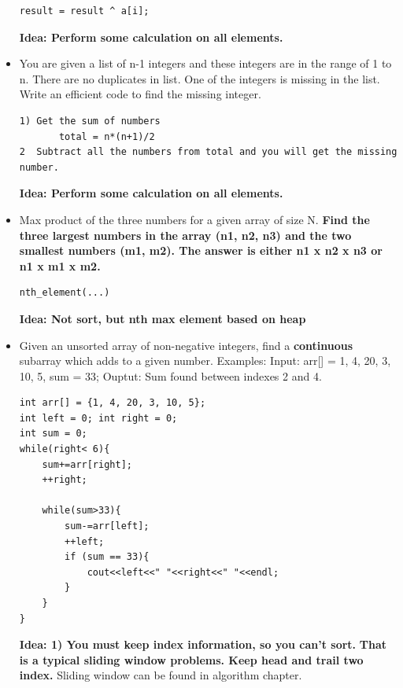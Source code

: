 \documentclass[a4paper,11pt,twoside]{book}
\begin{document}
\begin{itemize}
\begin{lstlisting}[breaklines]
	result = result ^ a[i];
\end{lstlisting}
\textbf{Idea: Perform some calculation on all elements. }


	\item You are given a list of n-1 integers and these integers are in the range of 1 to n. There are no duplicates in list. One of the integers is missing in the list. Write an efficient code to find the missing integer.
\begin{lstlisting}[breaklines]
1) Get the sum of numbers 
       total = n*(n+1)/2
2  Subtract all the numbers from total and you will get the missing number.
\end{lstlisting}
\textbf{Idea: Perform some calculation on all elements. }

	\item Max product of the three numbers for a given array of size N. \textbf{Find the three largest numbers in the array (n1, n2, n3) and the two smallest numbers (m1, m2). The answer is either n1 x n2 x n3 or n1 x m1 x m2.}
\begin{lstlisting}[breaklines]
nth_element(...)
\end{lstlisting}
\textbf{Idea: Not sort, but nth max element based on heap}

	\item Given an unsorted array of non-negative integers, find a \textbf{continuous} subarray which adds to a given number.  Examples: Input: arr[] = {1, 4, 20, 3, 10, 5}, sum = 33; Ouptut: Sum found between indexes 2 and 4. 

\begin{lstlisting}[breaklines]
int arr[] = {1, 4, 20, 3, 10, 5};
int left = 0; int right = 0;
int sum = 0;
while(right< 6){
	sum+=arr[right];
	++right;
	
	while(sum>33){
		sum-=arr[left];
		++left;
		if (sum == 33){
			cout<<left<<" "<<right<<" "<<endl;
		}
	}	
}
\end{lstlisting}
\textbf{Idea: 1) You must keep index information, so you can't sort. }  \textbf{That is a typical sliding window problems. Keep head and trail two index. } Sliding window can be found in algorithm chapter. 


\end{itemize}
\end{document}
